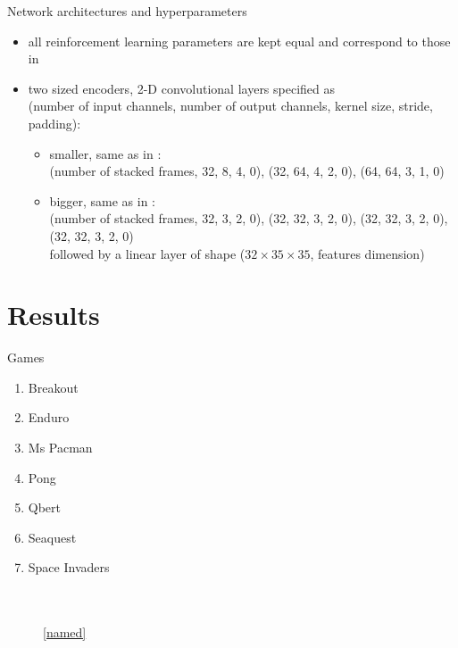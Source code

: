 \documentclass{beamer}
\begin{document}
\begin{frame}{Network architectures and hyperparameters}
\begin{itemize}
\item all reinforcement learning parameters are kept equal and correspond 
		to those in \cite{rainbow}
\item two sized encoders, 2-D convolutional layers specified as\\
		(number of input channels, number of output
channels, kernel size, stride, padding):
		\begin{itemize}
				\item smaller, same as in \cite{mnih2015humanlevel}: \\
(number of stacked frames, 32, 8, 4, 0), (32, 64, 4, 2, 0), (64, 64, 3, 1, 0)
\item bigger, same as in \cite{sac+ae}:\\
(number of stacked frames, 32, 3, 2, 0), 
(32, 32, 3, 2, 0),
(32, 32, 3, 2, 0),
(32, 32, 3, 2, 0) \\
followed by a linear layer of shape ($32 \times 35 \times 35$, features dimension)
		\end{itemize}
\end{itemize}
\end{frame}

\section{Results}

\begin{frame}{Games}
\begin{enumerate}
		\item Breakout
		\item Enduro
		\item Ms Pacman
		\item Pong
		\item Qbert
		\item Seaquest
		\item Space Invaders
\end{enumerate}
\end{frame}


\begin{frame}[plain]
\begin{figure}[!t]
  \captionsetup[subfloat]{position=top,labelformat=empty}
  \centering
    \subfloat[]{  \resizebox{0.4\textwidth}{!}{}}
    \subfloat[]{  \resizebox{0.4\textwidth}{!}{}}\\
  \vspace{-1cm}
    \subfloat[]{  \resizebox{0.4\textwidth}{!}{}}
    \subfloat[]{  \resizebox{0.4\textwidth}{!}{}}\\
    \ref{named}
\end{figure}
\end{frame}
\end{document}
